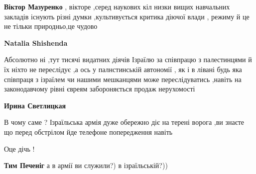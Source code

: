 \begin{itemize}
\begin{itemize}
 
\textbf{Віктор Мазуренко} , вікторе ,серед наукових кіл низки вищих навчальних
закладів існують різні думки ,культивується критика діючої влади , режиму й це
не тільки природньо,це чудово

 
\textbf{Natalia Shishenda} 

Абсолютно ні ,тут тисячі видатних діячів Ізраїлю за
співпрацю з палестинцями й їх ніхто не переслідує ,а ось у палнстинській
автономії , як і в лівані будь яка співпраця з ізраїлем чи нашими мешканцями
може переслідуватись ,навіть на законодавчому рівні євреям забороняється продаж
нерухомості

 
\textbf{Ирина Светлицкая} 

В чому саме ? Ізраїльська армія дуже обережно діє на
терені ворога ,ви знаєте що перед обстрілом йде телефоне попередження навіть

 
Оце дічь !
🤣

 
\textbf{Тим Печеніг} а в армії ви служили?) в ізраїльській?))

\end{itemize}


\end{itemize}
